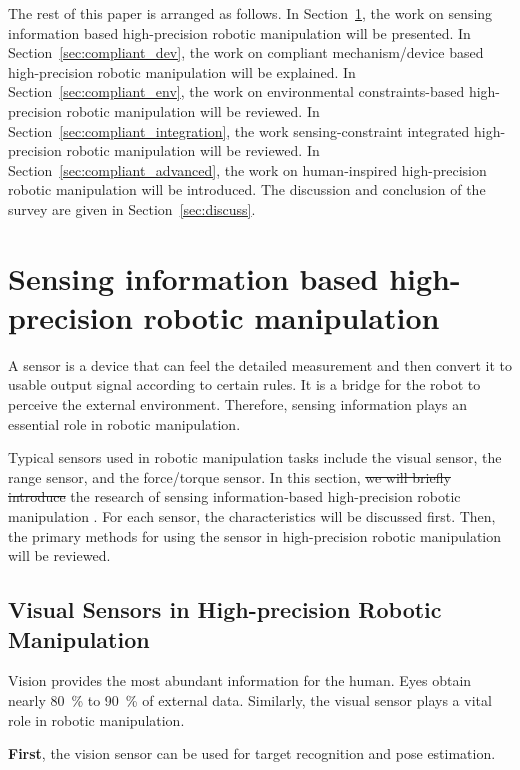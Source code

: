 \documentclass[journal,twoside,web]{ieeecolor}
\providecommand{\DIFadd}[1]{{\protect\color{blue}\uwave{#1}}} %
\providecommand{\DIFdel}[1]{{\protect\color{red}\sout{#1}}}                      %
\providecommand{\DIFaddbegin}{} %
\providecommand{\DIFaddend}{} %
\providecommand{\DIFdelbegin}{} %
\providecommand{\DIFdelend}{} %
\newcommand{\DIFscaledelfig}{0.5}
\newlength{\DIFdelgraphicswidth} %
\newlength{\DIFdelgraphicsheight} %
\newcommand{\DIFaddincludegraphics}[2][]{{\color{blue}\fbox{\DIFOincludegraphics[#1]{#2}}}} %
\newcommand{\DIFdelincludegraphics}[2][]{%
\sbox{\DIFdelgraphicsbox}{\DIFOincludegraphics[#1]{#2}}%
\settoboxwidth{\DIFdelgraphicswidth}{\DIFdelgraphicsbox} %
\settoboxtotalheight{\DIFdelgraphicsheight}{\DIFdelgraphicsbox} %
\scalebox{\DIFscaledelfig}{%
\parbox[b]{\DIFdelgraphicswidth}{\usebox{\DIFdelgraphicsbox}\\[-\baselineskip] \rule{\DIFdelgraphicswidth}{0em}}\llap{\resizebox{\DIFdelgraphicswidth}{\DIFdelgraphicsheight}{%
\setlength{\unitlength}{\DIFdelgraphicswidth}%
\begin{picture}(1,1)%
\thicklines\linethickness{2pt} %
{\color[rgb]{1,0,0}\put(0,0){\framebox(1,1){}}}%
{\color[rgb]{1,0,0}\put(0,0){\line( 1,1){1}}}%
{\color[rgb]{1,0,0}\put(0,1){\line(1,-1){1}}}%
\end{picture}%
}\hspace*{3pt}}} %
} %
\DeclareRobustCommand{\DIFaddbegin}{\DIFOaddbegin \let\includegraphics\DIFaddincludegraphics} %
\DeclareRobustCommand{\DIFaddend}{\DIFOaddend \let\includegraphics\DIFOincludegraphics} %
\DeclareRobustCommand{\DIFdelbegin}{\DIFOdelbegin \let\includegraphics\DIFdelincludegraphics} %
\DeclareRobustCommand{\DIFdelend}{\DIFOaddend \let\includegraphics\DIFOincludegraphics} %
\begin{document}
The rest of this paper is arranged as follows. 
In Section~\ref{sec:compliant_sensor}, the work on sensing information based high-precision robotic manipulation will be presented. 
In Section~\ref{sec:compliant_dev}, the work on compliant mechanism/device based high-precision robotic manipulation will be explained. 
In Section~\ref{sec:compliant_env}, the work on environmental constraints-based high-precision robotic manipulation will be reviewed. 
In Section~\ref{sec:compliant_integration}, the work sensing-constraint integrated high-precision robotic manipulation will be reviewed. 
In Section~\ref{sec:compliant_advanced}, the work on human-inspired high-precision robotic manipulation will be introduced. The discussion and conclusion of the survey are given in Section~\ref{sec:discuss}.

\section{Sensing information based high-precision robotic manipulation}
\label{sec:compliant_sensor}

A sensor is a device that can feel the detailed measurement and then convert it to \DIFaddbegin \DIFadd{a }\DIFaddend usable output signal according to certain rules. It is a bridge for the robot to perceive the external environment. Therefore, sensing information plays an essential role in robotic manipulation.

Typical sensors used in robotic manipulation tasks include the visual sensor, the range sensor, and the force/torque sensor. In this section, \DIFdelbegin \DIFdel{we will briefly introduce }\DIFdelend the research of sensing information-based high-precision robotic manipulation \DIFaddbegin \DIFadd{will be briefly introduced}\DIFaddend . For each sensor, the characteristics will be discussed first. Then, the primary methods for using the sensor in high-precision robotic manipulation will be reviewed.

\subsection{Visual Sensors in High-precision Robotic Manipulation}
\label{subsec:visual_sensor}

Vision provides the most abundant information for the human. Eyes obtain nearly \SI{80}{\percent} to \SI{90}{\percent} of external data. Similarly, the visual sensor plays a vital role in robotic manipulation. 

\textbf{First}, the vision sensor can be used for target recognition and pose estimation. 
\end{document}
